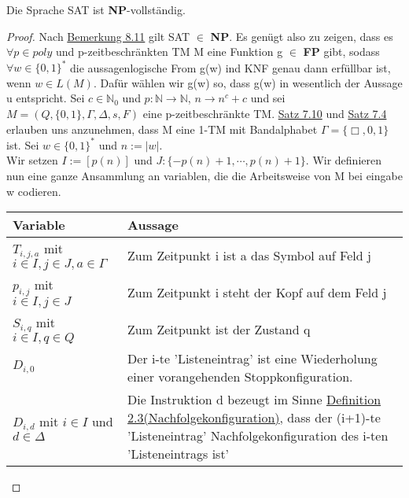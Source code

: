     Die Sprache SAT ist \textbf{NP}-vollständig. 
    \begin{proof}
        Nach \hyperref[subsec:8.11]{Bemerkung 8.11} gilt SAT \(\in\) \textbf{NP}. Es genügt also zu zeigen, dass es \(\forall p \in poly\) und p-zeitbeschränkten TM M eine Funktion g \(\in\) \textbf{FP} gibt, sodass \(\forall w \in \{0, 1\}^*\) die aussagenlogische From g(w) ind KNF genau dann erfüllbar ist, wenn \(w \in L(M)\). Dafür wählen wir g(w) so, dass g(w) in wesentlich der Aussage u entspricht. Sei \(c \in \mathbb{N}_0\) und \(p: \mathbb{N} \to \mathbb{N}\), \(n \to n^c + c\) und sei \(M = (Q, \{0, 1\}, \Gamma, \Delta, s, F)\) eine p-zeitbeschränkte TM. \hyperref[subsec:7.10]{Satz 7.10} und \hyperref[subsec:7.4]{Satz 7.4} erlauben uns anzunehmen, dass M eine 1-TM mit Bandalphabet \(\Gamma = \{\Box, 0, 1\}\) ist. Sei \(w \in \{0, 1\}^*\) und \(n :=|w|\).
        \vspace*{0.5cm}
        \\
        Wir setzen \(I:= [p(n)]\) und \(J: \{-p(n)+1, \cdots, p(n)+1\}\). Wir definieren nun eine ganze Ansammlung an variablen, die die Arbeitsweise von M bei eingabe w codieren.
        \begin{center}
            \setlength{\extrarowheight}{3pt} %
            \begin{tabular}{l|p{10cm}}
                Variable & Aussage \\
                \hline
                \hline
                \(T_{i, j, a}\) mit \(i \in I, j \in J, a \in \Gamma\) & Zum Zeitpunkt i ist a das Symbol auf Feld j \\
                \hline
                \(p_{i, j}\) mit \(i \in I, j \in J\) & Zum Zeitpunkt i steht der Kopf auf dem Feld j \\
                \hline
                \(S_{i, q}\) mit \(i \in I, q \in Q\) & Zum Zeitpunkt ist der Zustand q \\
                \hline
                \(D_{i, 0}\) & Der i-te 'Listeneintrag' ist eine Wiederholung einer vorangehenden Stoppkonfiguration. \\
                \hline
                \(D_{i, d}\) mit \(i \in I\) und \(d \in \Delta\) & Die Instruktion d bezeugt im Sinne \hyperref[subsec:2.3]{Definition 2.3(Nachfolgekonfiguration)}, dass der (i+1)-te 'Listeneintrag' Nachfolgekonfiguration des i-ten 'Listeneintrags ist' \\
            \end{tabular}    
        \end{center}

\end{proof}
